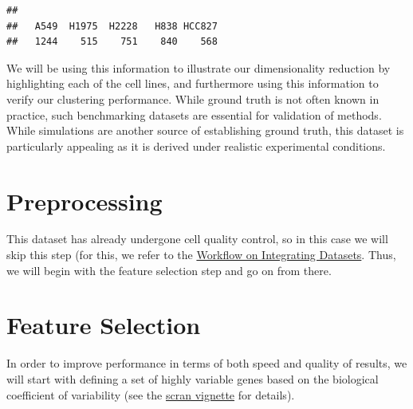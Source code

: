 \documentclass[]{book}
\begin{document}
\begin{verbatim}
## 
##   A549  H1975  H2228   H838 HCC827 
##   1244    515    751    840    568
\end{verbatim}

We will be using this information to illustrate our dimensionality reduction by highlighting each of the cell lines, and furthermore using this information to verify our clustering performance. While ground truth is not often known in practice, such benchmarking datasets are essential for validation of methods. While simulations are another source of establishing ground truth, this dataset is particularly appealing as it is derived under realistic experimental conditions.

\hypertarget{preprocessing-2}{%
\section{Preprocessing}\label{preprocessing-2}}

This dataset has already undergone cell quality control, so in this case we will skip this step (for this, we refer to the \protect\hyperlink{workflow-integrating-datasets}{Workflow on Integrating Datasets}. Thus, we will begin with the feature selection step and go on from there.

\hypertarget{feature-selection-1}{%
\section{Feature Selection}\label{feature-selection-1}}

In order to improve performance in terms of both speed and quality of results, we will start with defining a set of highly variable genes based on the biological coefficient of variability (see the \href{https://bioconductor.org/packages/devel/bioc/vignettes/scran/inst/doc/scran.html\#5_variance_modelling}{scran vignette} for details).
\end{document}
